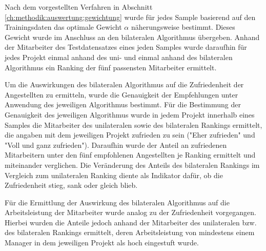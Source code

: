 Nach dem vorgestellten Verfahren in Abschnitt \ref{ch:methodik:auswertung:gewichtung} wurde für jedes Sample basierend auf den Trainingsdaten das optimale Gewicht $\alpha$ näherungsweise bestimmt.
Dieses Gewicht wurde im Anschluss an den bilateralen Algorithmus übergeben.
Anhand der Mitarbeiter des Testdatensatzes eines jeden Samples wurde daraufhin für jedes Projekt einmal anhand des uni- und einmal anhand des bilateralen Algorithmus ein Ranking der fünf passensten Mitarbeiter ermittelt.

Um die Auswirkungen des bilateralen Algorithmus auf die Zufriedenheit der Angestellten zu ermitteln, wurde die Genauigkeit der Empfehlungen unter Anwendung des jeweiligen Algorithmus bestimmt.
Für die Bestimmung der Genauigkeit des jeweiligen Algorithmus wurde in jedem Projekt innerhalb eines Samples die Mitarbeiter des unilateralen sowie des bilateralen Rankings ermittelt, die angaben mit dem jeweiligen Projekt zufrieden zu sein ("Eher zufrieden" und "Voll und ganz zufrieden").
Daraufhin wurde der Anteil an zufriedenen Mitarbeitern unter den fünf empfohlenen Angestellten je Ranking ermittelt und miteinander verglichen.
Die Veränderung des Anteils des bilateralen Rankings im Vergleich zum unilateralen Ranking diente als Indikator dafür, ob die Zufriedenheit stieg, sank oder gleich blieb.

Für die Ermittlung der Auswirkung des bilateralen Algorithmus auf die Arbeitsleistung der Mitarbeiter wurde analog zu der Zufriedenheit vorgegangen.
Hierbei wurden die Anteile jedoch anhand der Mitarbeiter des unilateralen bzw. des bilateralen Rankings ermittelt, deren Arbeitsleistung von mindestens einem Manager in dem jeweiligen Projekt als hoch eingestuft wurde.



